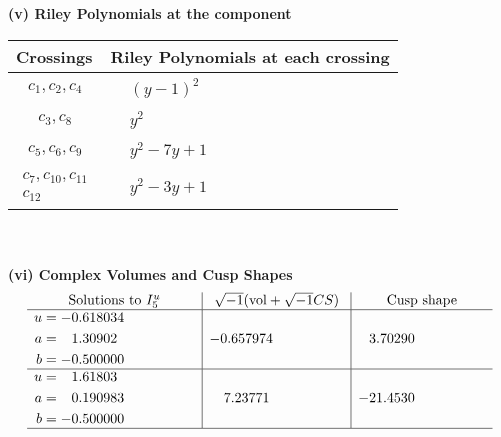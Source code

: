 \documentclass[1p]{elsarticle_modified}
\theoremstyle{definition}
\newcommand{\I}{\sqrt{-1}}
\begin{document}
\newpage\renewcommand{\arraystretch}{1}
\flushleft \textbf{(v) Riley Polynomials at the component}\newline \\
\begin{tabular}{m{50pt}|m{274pt}}
Crossings & \hspace{64pt}Riley Polynomials at each crossing \\
\hline $$\begin{aligned}c_{1},c_{2},c_{4}\end{aligned}$$&$\begin{aligned}
&(y-1)^2
\end{aligned}$\\
\hline $$\begin{aligned}c_{3},c_{8}\end{aligned}$$&$\begin{aligned}
&y^2
\end{aligned}$\\
\hline $$\begin{aligned}c_{5},c_{6},c_{9}\end{aligned}$$&$\begin{aligned}
&y^2-7 y+1
\end{aligned}$\\
\hline $$\begin{aligned}c_{7},c_{10},c_{11}\\c_{12}\end{aligned}$$&$\begin{aligned}
&y^2-3 y+1
\end{aligned}$\\
\hline
\end{tabular}\\~\\
\newpage\flushleft \textbf{(vi) Complex Volumes and Cusp Shapes}
$$\begin{array}{c|c|c}  
\text{Solutions to }I^u_{5}& \I (\text{vol} + \sqrt{-1}CS) & \text{Cusp shape}\\
 \hline 
\begin{aligned}
u &= -0.618034\phantom{ +0.000000I} \\
a &= \phantom{-}1.30902\phantom{ +0.000000I} \\
b &= -0.500000\phantom{ +0.000000I}\end{aligned}
 & -0.657974\phantom{ +0.000000I} & \phantom{-}3.70290\phantom{ +0.000000I} \\ \hline\begin{aligned}
u &= \phantom{-}1.61803\phantom{ +0.000000I} \\
a &= \phantom{-}0.190983\phantom{ +0.000000I} \\
b &= -0.500000\phantom{ +0.000000I}\end{aligned}
 & \phantom{-}7.23771\phantom{ +0.000000I} & -21.4530\phantom{ +0.000000I}\\
 \hline 
 \end{array}$$\newpage
\end{document}
